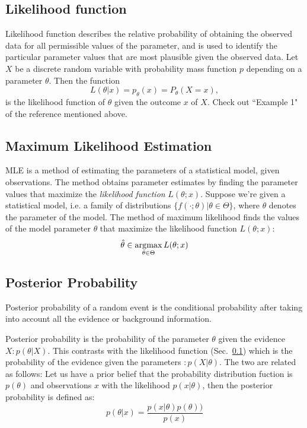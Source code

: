 \subsection[Likelihood function]{Likelihood function\cite{WikiLikelihoodFunction}}
\label{sec:likelihood_function}
Likelihood function describes the relative probability of obtaining the observed data for all permissible values of the parameter, and is used to identify the particular parameter values that are most plausible given the observed data. Let $X$ be a discrete random variable with probability mass function $p$ depending on a parameter $\theta$. Then the function
\begin{equation}
L(\theta|x) = p_{\theta}(x) = P_{\theta}(X = x),
\end{equation}
is the likelihood function of $\theta$ given the outcome $x$ of $X$. Check out ``Example 1" of the reference mentioned above.

\subsection[Maximum Likelihood Estimation]{Maximum Likelihood Estimation\cite{WikiMLE}}
\label{sec:MLE}
MLE is a method of estimating the parameters of a statistical model, given observations. The method obtains parameter estimates by finding the parameter values that maximize the \emph{likelihood function} $L(\theta; x)$. Suppose we're given a statistical model, i.e. a family of distributions $\{f(\cdot ; \theta)| \theta \in \Theta\}$, where $\theta$ denotes the parameter of the model. The method of maximum likelihood finds the values of the model parameter $\theta$ that maximize the likelihood function $L(\theta; x)$:
\begin{equation}
    \hat \theta \in {\operatorname*{arg\!\max}_{\theta \in \Theta} L(\theta; x)}
\end{equation}

\subsection[Posterior Probability]{Posterior Probability\cite{WikiPosteriorProbability}}
\label{sec:posterior_probability}
Posterior probability of a random event is the conditional probability after taking into account all the evidence or background information.

Posterior probability is the probability of the parameter $\theta$ given the evidence $X:p(\theta | X)$. This contrasts with the likelihood function (Sec.~\ref{sec:likelihood_function}) which is the probability of the evidence given the parameters $:p(X | \theta)$. The two are related as follows: Let us have a prior belief that the probability distribution fuction is $p(\theta)$ and observations $x$ with the likelihood $p(x|\theta)$, then the posterior probability is defined as:
\begin{equation}
    p(\theta|x) = \frac{p(x|\theta) p(\theta))}{p(x)}
\end{equation}


